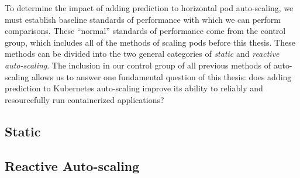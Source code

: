 To determine the impact of adding prediction to horizontal pod auto-scaling, we
must establish baseline standards of performance with which we can perform comparisons.
These ``normal'' standards of performance come from the control group, which
includes all of the methods of scaling pods before this thesis. These methods
can be divided into the two general categories of \textit{static} and
\textit{reactive auto-scaling}. The inclusion in our control group of all
previous methods of auto-scaling allows us to answer one fundamental question of
this thesis: does adding prediction to Kubernetes auto-scaling improve its
ability to reliably and resourcefully run containerized applications?

\subsection{Static}



\subsection{Reactive Auto-scaling}


